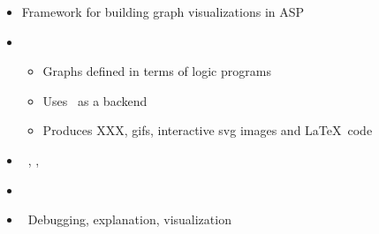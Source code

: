 \begin{frame}{\clingraph}
  \begin{itemize}
    \item {} Framework for building graph visualizations in ASP
    \item {}
      \begin{itemize}
      \item Graphs defined in terms of logic programs %
      \item Uses \graphviz\ as a backend
      \item Produces XXX, gifs, interactive svg images and \LaTeX\ code
      \end{itemize}
    \item {}   \ \clingo, \clorm, \graphviz
    \item {}   \ \cite{hasascst22a}
    \item {} \ Debugging, explanation, visualization %
  \end{itemize}
\end{frame}
%

